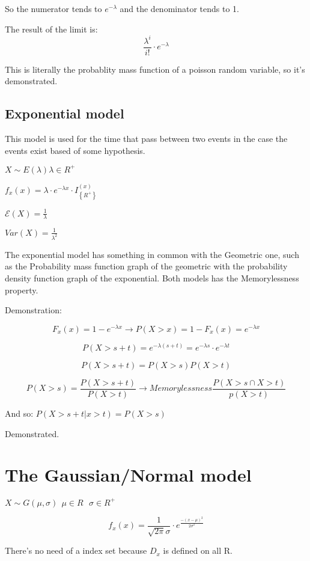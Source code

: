 \documentclass{article}
\begin{document}
So the numerator tends to $e^{- \lambda}$ and the denominator tends to 1.

The result of the limit is: $$\frac{\lambda^i}{i!} \cdot e^{- \lambda}$$

This is literally the probablity mass function of a poisson random variable, so it's demonstrated.

\subsection{Exponential model}

This model is used for the time that pass between two events in the case the events exist based of some hypothesis.

$X \sim E(\lambda) \lambda \in R^+$
\bigskip

$f_x(x) = \lambda \cdot e^{- \lambda x} \cdot I_\left\{R^+\right\}^(x)$
\bigskip

$\mathcal E(X) = \frac{1}{\lambda}$

$Var(X) = \frac{1}{\lambda^2}$
\bigskip


The exponential model has something in common with the Geometric one, such as the Probability mass function graph of the geometric with the probability density function graph of the exponential. Both models has the Memorylessness property.
\bigskip

Demonstration:

$$F_x(x) = 1 - e^{-\lambda x} \rightarrow P(X > x) = 1 - F_x(x) = e^{- \lambda x}$$

$$P(X > s + t) = e^{- \lambda (s+t)} = e^{-\lambda s} \cdot e^{- \lambda t}$$

$$P(X > s + t ) = P(X > s)P(X > t)$$

$$P(X>s) = \frac{P(X > s +t )}{P(X > t)} \rightarrow Memorylessness \frac{P(X > s \cap X > t)}{p(X > t)}$$

And so: $P(X > s + t | x > t) = P(X>s)$

Demonstrated.

\section{The Gaussian/Normal model}

$X \sim G(\mu,\sigma) \ \ \mu \in R \ \ \ \sigma \in R^+$

$$f_x(x) = \frac{1}{\sqrt{2\pi}\sigma}\cdot e^{\frac{- (x - \mu)^2}{2\sigma^2}}$$

There's no need of a index set because $D_x$ is defined on all R.
\end{document}
